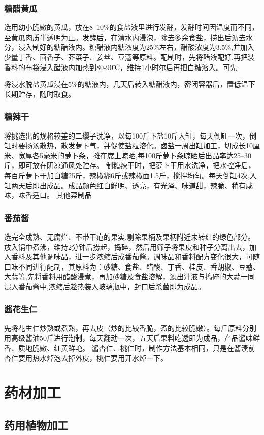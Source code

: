 \documentclass{ctexbook}
\begin{document}
\subsection{糖醋黄瓜}
选用幼小脆嫩的黄瓜，放在8--10\%的食盐液里进行发酵，发酵时间因温度而不同，至黄瓜肉质半透明为止。发酵后，在清水内浸泡，除去多余食盐，捞出后沥去水分，浸入制好的糖醋液内。糖醋液内糖浓度为25\%左右，醋酸浓度为3.5\%,并加入少量丁香、茴香子、芥菜子、姜丝、豆蔻等原料。配制时，先将醋液配好,再把装香料的布袋浸入醋液内加热到80-90℃，维持1小时尔后再把白糖溶入。可先

将浸水脱盐黄瓜浸在5\%的糖液内，几天后转入糖醋液内，密闭容器后，置低温下长期贮存，随时取食。
\subsection{糖辣干}
将挑选出的规格较差的二缨子洗净，以每100斤下盐10斤入缸，每天倒缸一次，倒缸时要扬汤散热，散发萝卜气，并促使盐粒溶化。卤盐一周出缸加工，切成长10厘米、宽厚各5毫米的萝卜条，摊在席上晾晒,每100斤萝卜条晾晒后出品率达25--30斤，即可放在阴凉通风处贮存。
制糖辣干时，把萝卜干用水洗净，把水控净后，每百斤萝卜干加白糖25斤，辣椒糊6斤或辣椒面1.5斤，搅拌均匀。每天倒缸4次,入缸两天后即出成品。成品颜色红白鲜明、透亮，有光泽、味道甜，辣脆、稍有咸味，味香适口。
其他菜制品
\subsection{番茄酱}
选完全成熟、无腐烂、不带干疤的果实,剔除果柄及果柄附近未转红的绿色部分。放入锅中煮沸，维持2分钟后捞起，捣碎，然后用筛子将果皮和种子分离出去，加入香料及其他调味品，进一步浓缩后成番茄酱。调味品和香料配方变化很大，可随口味不同进行配制，其原料为：砂糖、食盐、醋酸、丁香、桂皮、香胡椒、豆蔻、大蒜等,先将香料用醋酸浸煮，再加砂糖及食盐溶解，滤出汁液与捣碎的大蒜一同混入番茄酱中,浓缩后趁热装入玻璃瓶中，封口后杀菌即为成品。
\subsection{酱花生仁}
先将花生仁炒熟或煮熟，再去皮（炒的比较香脆，煮的比较脆嫩）。每斤原料分别用高级酱油50斤进行泡制，每天翻动一次，五天后果料吃透即为成品，产品酱味鲜香、质地脆嫩、红黄鲜艳。
酱杏仁、桃仁时，制作方法基本相同，只是在酱渍前杏仁要用热水焯泡去掉外皮，桃仁要用开水焯一下。


\chapter{药材加工}
\section{药用植物加工}
\end{document}
